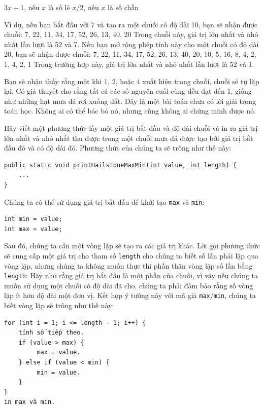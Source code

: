 \(3x + 1\), nếu \(x\) là số lẻ \(x / 2\), nếu \(x\) là số chẵn

Ví dụ, nếu bạn bắt đầu với 7 và tạo ra một chuỗi có độ dài 10, bạn sẽ
nhận được chuỗi: 7, 22, 11, 34, 17, 52, 26, 13, 40, 20 Trong chuỗi này,
giá trị lớn nhất và nhỏ nhất lần lượt là 52 và 7. Nếu bạn mở rộng phép
tính này cho một chuỗi có độ dài 20, bạn sẽ nhận được chuỗi: 7, 22, 11,
34, 17, 52, 26, 13, 40, 20, 10, 5, 16, 8, 4, 2, 1, 4, 2, 1 Trong trường
hợp này, giá trị lớn nhất và nhỏ nhất lần lượt là 52 và 1.

Bạn sẽ nhận thấy rằng một khi 1, 2, hoặc 4 xuất hiện trong chuỗi, chuỗi
sẽ tự lặp lại. Có giả thuyết cho rằng tất cả các số nguyên cuối cùng đều
đạt đến 1, giống như những hạt mưa đá rơi xuống đất. Đây là một bài toán
chưa có lời giải trong toán học. Không ai có thể bác bỏ nó, nhưng cũng
không ai chứng minh được nó.

Hãy viết một phương thức lấy một giá trị bắt đầu và độ dài chuỗi và in
ra giá trị lớn nhất và nhỏ nhất thu được trong một chuỗi mưa đá được tạo
bởi giá trị bắt đầu đó và có độ dài đó. Phương thức của chúng ta sẽ
trông như thế này:

\begin{verbatim}
public static void printHailstoneMaxMin(int value, int length) {
    ...
}
\end{verbatim}

Chúng ta có thể sử dụng giá trị bắt đầu để khởi tạo \texttt{max} và
\texttt{min}:

\begin{verbatim}
int min = value;
int max = value;
\end{verbatim}

Sau đó, chúng ta cần một vòng lặp sẽ tạo ra các giá trị khác. Lời gọi
phương thức sẽ cung cấp một giá trị cho tham số \texttt{length} cho
chúng ta biết số lần phải lặp qua vòng lặp, nhưng chúng ta không muốn
thực thi phần thân vòng lặp số lần bằng \texttt{length}: Hãy nhớ rằng
giá trị bắt đầu là một phần của chuỗi, vì vậy nếu chúng ta muốn sử dụng
một chuỗi có độ dài đã cho, chúng ta phải đảm bảo rằng số vòng lặp ít
hơn độ dài một đơn vị. Kết hợp ý tưởng này với mã giả
\texttt{max}/\texttt{min}, chúng ta biết vòng lặp sẽ trông như thế này:

\begin{verbatim}
for (int i = 1; i <= length - 1; i++) {
    tính số tiếp theo.
    if (value > max) {
         max = value.
    } else if (value < min) {
         min = value.
    }
}
in max và min.
\end{verbatim}

